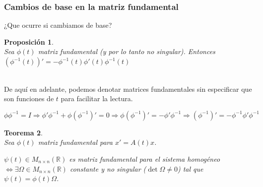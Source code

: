 \documentclass[11pt, a4paper,twoside]{article}
\makeatletter
\theoremstyle{theorem-style}  %
\newtheorem{theorem}{Teorema}[section]  %
\newtheorem{proposition}[theorem]{Proposición}
\renewenvironment{proof}[1][\proofname]{\par
	\pushQED{\qed}%
	\normalfont \topsep6\p@\@plus6\p@\relax
	\list{}{%
		\settowidth{\leftmargin}{\quad:\hskip\labelsep}%
		\setlength{\labelwidth}{0pt}%
		\setlength{\itemindent}{-\leftmargin}%
	}%
	\item[\hskip\labelsep\itshape#1\@addpunct{:}]\ignorespaces
}{%
	\popQED\endlist\@endpefalse
}
\theoremstyle{definition-style}
\theoremstyle{example-style}
\makeatother
\begin{document}
\subsubsection{Cambios de base en la matriz fundamental}
¿Que ocurre si cambiamos de base?
\begin{proposition}\label{derivinversa}\ \\
	Sea $ \phi(t) $ matriz fundamental (y por lo tanto no singular). Entonces $ (\phi^{-1}(t))'=-\phi^{-1}(t)\phi'(t)\phi^{-1}(t) $
\end{proposition}
\begin{proof}\ \\
	De aquí en adelante, podemos denotar matrices fundamentales sin especificar que son funciones de $ t $ para facilitar la lectura.
	
	\[ \phi \phi^{-1}=I\Rightarrow \phi'\phi^{-1}+\phi (\phi^{-1})'=0\Rightarrow \phi (\phi^{-1})'=-\phi'\phi^{-1} \Rightarrow (\phi^{-1})'=-\phi^{-1}\phi'\phi^{-1}\]
\end{proof}
\begin{theorem}\ \\
	Sea $ \phi(t) $ matriz fundamental para $ x'=A(t)x $.
	
	$ \psi(t) \in M_{n\times n}(\mathbb{R})$ es matriz fundamental para el sistema homogéneo $ \Leftrightarrow \exists \varOmega \in M_{n\times n}(\mathbb{R})$ constante y no singular ($ \det \varOmega \neq 0 $) tal que $ \psi(t) = \phi(t)\varOmega $.
\end{theorem}
\end{document}
